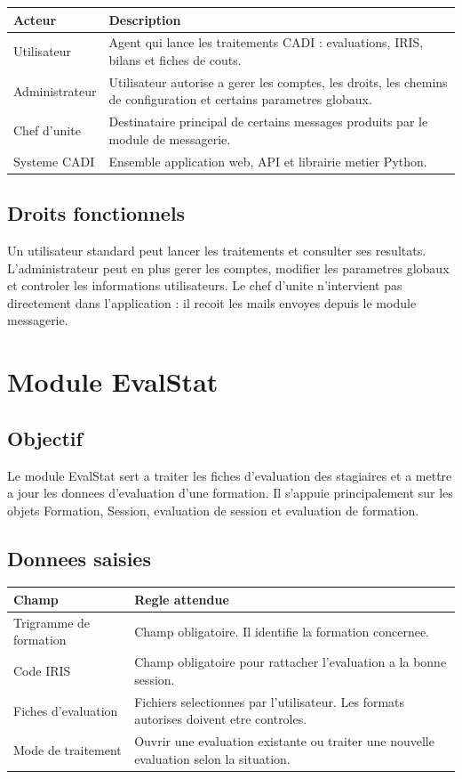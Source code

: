 \documentclass[11pt,a4paper]{report}
\begin{document}
\begin{longtable}{L{4cm} L{10cm}}
\toprule
{}
\textbf{Acteur} & \textbf{Description} \\
\midrule
Utilisateur & Agent qui lance les traitements CADI : evaluations, IRIS, bilans et fiches de couts. \\
Administrateur & Utilisateur autorise a gerer les comptes, les droits, les chemins de configuration et certains parametres globaux. \\
Chef d'unite & Destinataire principal de certains messages produits par le module de messagerie. \\
Systeme CADI & Ensemble application web, API et librairie metier Python. \\
\bottomrule
\end{longtable}

\section{Droits fonctionnels}

Un utilisateur standard peut lancer les traitements et consulter ses resultats. L'administrateur peut en plus gerer les comptes, modifier les parametres globaux et controler les informations utilisateurs. Le chef d'unite n'intervient pas directement dans l'application : il recoit les mails envoyes depuis le module messagerie.

\chapter{Module EvalStat}

\section{Objectif}

Le module EvalStat sert a traiter les fiches d'evaluation des stagiaires et a mettre a jour les donnees d'evaluation d'une formation. Il s'appuie principalement sur les objets Formation, Session, evaluation de session et evaluation de formation.

\section{Donnees saisies}

\begin{longtable}{L{5cm} L{9cm}}
\toprule
{}
\textbf{Champ} & \textbf{Regle attendue} \\
\midrule
Trigramme de formation & Champ obligatoire. Il identifie la formation concernee. \\
Code IRIS & Champ obligatoire pour rattacher l'evaluation a la bonne session. \\
Fiches d'evaluation & Fichiers selectionnes par l'utilisateur. Les formats autorises doivent etre controles. \\
Mode de traitement & Ouvrir une evaluation existante ou traiter une nouvelle evaluation selon la situation. \\
\bottomrule
\end{longtable}
\end{document}
